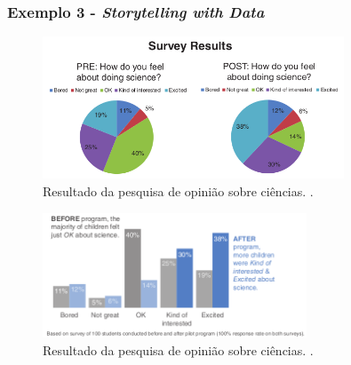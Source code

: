 \begin{frame}[allowframebreaks=1]
\frametitle{Exemplo 3 - \emph{Storytelling with Data}}
\begin{figure}[h]
 \centering
 \includegraphics[width=0.8\textwidth,height=0.6\textheight,keepaspectratio]{figures/storytelling_data_ex03a.png}
 \caption{Resultado da pesquisa de opinião sobre ciências. \cite{knaflic_storytelling_2015}.}
 \label{fig-storytelling_data_ex03a}
\end{figure}
\framebreak
\begin{figure}[h]
 \centering
 \includegraphics[width=0.7\textwidth,height=0.6\textheight,keepaspectratio]{figures/storytelling_data_ex03b.png}
 \caption{Resultado da pesquisa de opinião sobre ciências. \cite{knaflic_storytelling_2015}.}
 \label{fig-storytelling_data_ex03b}
\end{figure}
\end{frame}


